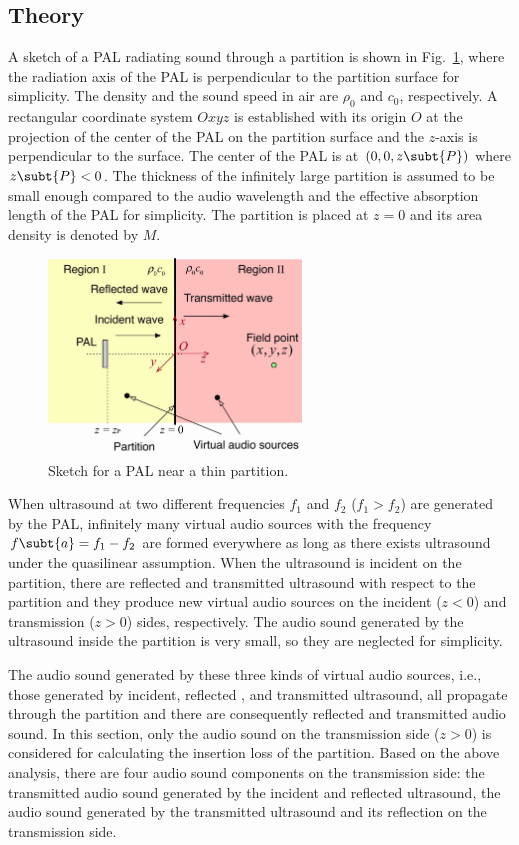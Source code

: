 \subsection{Theory}

A sketch of a PAL radiating sound through a partition is shown in Fig.~\ref{fig:partition}, where the radiation axis of the PAL is perpendicular to the partition surface for simplicity.
The density and the sound speed in air are $\rho_0$ and $c_0$, respectively.
A rectangular coordinate system $Oxyz$ is established with its origin $O$ at the projection of the center of the PAL on the partition surface and the $z$\mbox{-axis} is perpendicular to the surface.
The center of the PAL is at $(0,0,z\subt{P})$ where $z\subt{P} <0$. 
The thickness of the infinitely large partition is assumed to be small enough compared to the audio wavelength and the effective absorption length of the PAL for simplicity. 
The partition is placed at $z=0$ and its area density is denoted by $M$.
\begin{figure}[!htb]
    \centering
    \includegraphics[width=0.6\textwidth]{Figures/PALpartitionv2.jpg}
    \caption{Sketch for a PAL near a thin partition.}
    \label{fig:partition}
\end{figure}
When ultrasound at two different frequencies $f_1$ and $f_2$ ($f_1>f_2$) are generated by the PAL, infinitely many virtual audio sources with the frequency $f\subt{a} = f_1-f_2$ are formed everywhere as long as there exists ultrasound under the quasilinear assumption. 
When the ultrasound is incident on the partition, there are reflected and transmitted ultrasound with respect to the partition and they produce new virtual audio sources on the incident ($z<0$) and transmission ($z>0$) sides, respectively.
The audio sound generated by the ultrasound inside the partition is very small, so they are neglected for simplicity.

The audio sound generated by these three kinds of virtual audio sources, i.e., those generated by incident, reflected , and transmitted ultrasound, all propagate through the partition and there are consequently reflected and transmitted audio sound. 
In this section, only the audio sound on the transmission side ($z>0$) is considered for calculating the insertion loss of the partition.
Based on the above analysis, there are four audio sound components on the transmission side: the transmitted audio sound generated by the incident and reflected ultrasound, the audio sound generated by the transmitted ultrasound and its reflection on the transmission side.

